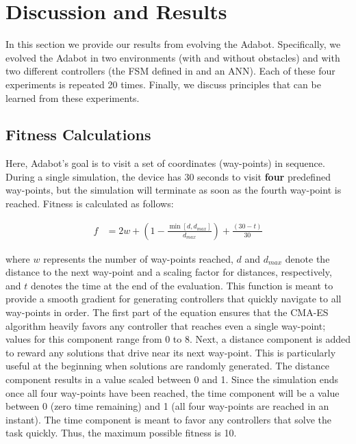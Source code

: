 \section{Discussion and Results}
\label{sec:results}

In this section we provide our results from evolving the Adabot.
%
Specifically, we evolved the Adabot in two environments (with and without obstacles) and with two different controllers (the FSM defined in  and an ANN). Each of these four experiments is repeated 20 times.
%
Finally, we discuss principles that can be learned from these experiments.


\subsection{Fitness Calculations}

%
Here, Adabot's goal is to visit a set of coordinates (way-points) in sequence.
%
During a single simulation, the device has 30 seconds to visit \textbf{four} predefined way-points, but the simulation will terminate as soon as the fourth way-point is reached.
%
Fitness is calculated as follows:

\vspace{-0.08in}

\begin{align}
    f &= 2w + (1-\frac{\min[d, d_\mathit{max}]}{d_\mathit{max}}) + \frac{(30 - t)}{30}
\end{align}

\noindent
where $w$ represents the number of way-points reached, $d$ and $d_\mathit{max}$ denote the distance to the next way-point and a scaling factor for distances, respectively, and $t$ denotes the time at the end of the evaluation.
%
This function is meant to provide a smooth gradient for generating controllers that quickly navigate to all way-points in order.
%
The first part of the equation ensures that the CMA-ES algorithm heavily favors any controller that reaches even a single way-point; values for this component range from 0 to 8.
%
Next, a distance component is added to reward any solutions that drive near its next way-point. This is particularly useful at the beginning when solutions are randomly generated.
%
The distance component results in a value scaled between 0 and 1.
%
Since the simulation ends once all four way-points have been reached, the time component will be a value between 0 (zero time remaining) and 1 (all four way-points are reached in an instant).
%
The time component is meant to favor any controllers that solve the task quickly.
%
Thus, the maximum possible fitness is 10.


